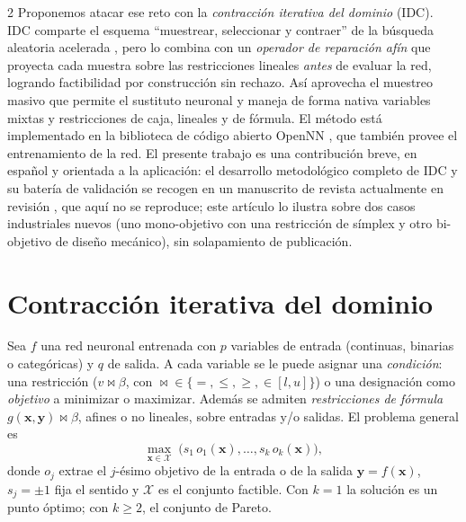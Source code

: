 \documentclass[5p,times,authoryear]{sciarticle}
\begin{document}
\begin{multicols}{2}
Proponemos atacar ese reto con la \emph{contracción iterativa del dominio}
(IDC). IDC comparte el esquema ``muestrear, seleccionar y contraer'' de la
búsqueda aleatoria acelerada \citep{Appel2003}, pero lo combina con un
\emph{operador de reparación afín} que proyecta cada muestra sobre las
restricciones lineales \emph{antes} de evaluar la red, logrando factibilidad
por construcción sin rechazo. Así aprovecha el muestreo masivo que permite el
sustituto neuronal y maneja de forma nativa variables mixtas y restricciones
de caja, lineales y de fórmula. El método está implementado en la biblioteca
de código abierto OpenNN \citep{OpenNN2026}, que también provee el
entrenamiento de la red. El presente trabajo es una contribución breve, en
español y orientada a la aplicación: el desarrollo metodológico completo de
IDC y su batería de validación se recogen en un manuscrito de revista
actualmente en revisión \citep{Scala2026IDC}, que aquí no se reproduce; este
artículo lo ilustra sobre dos casos industriales nuevos (uno mono-objetivo
con una restricción de símplex y otro bi-objetivo de diseño mecánico), sin
solapamiento de publicación.

\section{Contracción iterativa del dominio}
\label{sec:metodo}
Sea $f$ una red neuronal entrenada con $p$ variables de entrada (continuas,
binarias o categóricas) y $q$ de salida. A cada variable se le puede
asignar una \emph{condición}: una restricción ($v\bowtie\beta$, con
$\bowtie\in\{=,\le,\ge,\in[l,u]\}$) o una designación como
\emph{objetivo} a minimizar o maximizar. Además se admiten
\emph{restricciones de fórmula} $g(\bm{x},\bm{y})\bowtie\beta$, afines o
no lineales, sobre entradas y/o salidas. El problema general es
\begin{equation}
  \max_{\bm{x}\in\mathcal{X}}\;\bigl(s_1\,o_1(\bm{x}),\ldots,s_k\,o_k(\bm{x})\bigr),
  \label{eq:problema}
\end{equation}
donde $o_j$ extrae el $j$-ésimo objetivo de la entrada o de la salida
$\bm{y}=f(\bm{x})$, $s_j=\pm1$ fija el sentido y $\mathcal{X}$ es el
conjunto factible. Con $k=1$ la solución es un punto óptimo; con
$k\ge 2$, el conjunto de Pareto.


\end{multicols}
\end{document}
